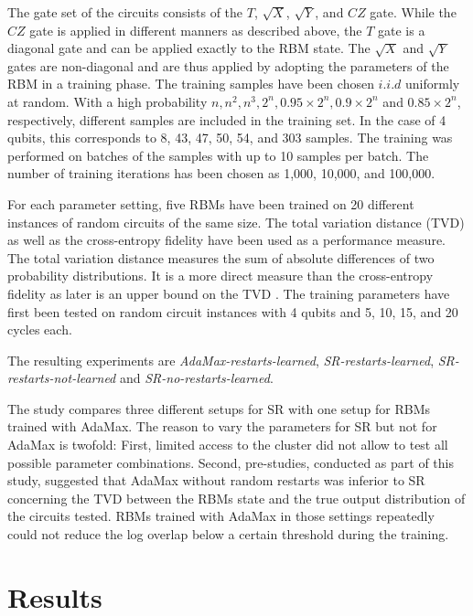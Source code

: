 The gate set of the circuits consists of the $T$, $\sqrt{X}$, $\sqrt{Y}$, and $CZ$ gate. While the $CZ$ gate is 
applied in different manners as described above, the $T$ gate is a diagonal gate and can be applied exactly to the RBM state.
The $\sqrt{X}$ and $\sqrt{Y}$ gates are non-diagonal and are thus applied by adopting the parameters of the RBM in 
a training phase. The training samples have been chosen $i.i.d$ uniformly at random. 
With a high probability $n, n^2, n^3, 2^n, 0.95 \times 2^n, 0.9 \times 2^n$ and $0.85 \times 2^n$,
respectively, different samples are included in the training set. In the case of 4 qubits, this corresponds to 
8, 43, 47, 50, 54, and 303 samples. The training was performed on batches of the samples with 
up to 10 samples per batch.
The number of training iterations has been chosen as 1,000, 10,000, and 100,000. 

For each parameter setting, five RBMs have been trained on 20 different instances of random circuits of the same 
size. The total variation distance (TVD) as well as the cross-entropy fidelity have been used as a performance measure.
The total variation distance measures the sum of absolute differences of two probability distributions. 
It is a more direct measure than the cross-entropy fidelity as later is an upper bound on the TVD \cite{bouland2018quantum}.
The training parameters have first been tested on random circuit instances with 4 qubits and 
5, 10, 15, and 20 cycles each. 

The resulting experiments are \textit{AdaMax-restarts-learned}, \textit{SR-restarts-learned}, 
\textit{SR-restarts-not-learned} and \textit{SR-no-restarts-learned}. 

The study compares three different setups for SR with one setup for RBMs trained with 
AdaMax. The reason to vary the parameters for SR but not for AdaMax is twofold:
First, limited access to the cluster did not allow to test all possible parameter combinations. Second,
pre-studies, conducted as part of this study, suggested that AdaMax without random restarts 
was inferior to SR concerning the TVD between the RBMs state and the true output distribution of the 
circuits tested. RBMs trained with AdaMax in those settings repeatedly could not reduce the 
log overlap below a certain threshold during the training.

\section{Results}

